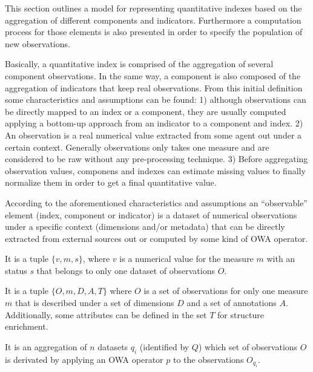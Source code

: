 This section outlines a model for representing quantitative indexes based on the aggregation 
of different components and indicators. Furthermore a computation process for those elements is 
also presented in order to specify the population of new observations.

Basically, a quantitative index is comprised of the aggregation of several component observations. In the same way, 
a component is also composed of the aggregation of indicators that keep real observations. From this initial definition 
some characteristics and assumptions can be found: 1) although observations can be directly mapped to an index or a component, they 
are usually computed applying a bottom-up approach from an indicator to a component and index. 2) An observation is 
a real numerical value extracted from some agent out under a certain context. Generally observations only takes one measure and are considered 
to be raw without any pre-processing technique. 3) Before aggregating observation values, componens and indexes can 
estimate missing values to finally normalize them in order to get a final quantitative value.

According to the aforementioned characteristics and assumptions an ``observable'' element (index, component or indicator) is a 
dataset of numerical observations under a specific context (dimensions and/or metadata) that can be directly extracted from external 
sources out or computed by some kind of OWA operator. 

\begin{definition}[Observation-$o$]\upshape
It is a tuple $\{v,m,s\}$, where $v$ is a numerical value for the measure $m$ with an status $s$ that belongs to 
only one dataset of observations $O$. 
\end{definition}


\begin{definition}[Dataset-$q$]\upshape
It is a tuple $\{O,m,D,A,T\}$ where $O$ is a set of observations for only one measure $m$ that is described under 
a set of dimensions $D$ and a set of annotations $A$. Additionally, some attributes can be defined in the set $T$ for structure enrichment. 
\end{definition}


\begin{definition}\upshape
It is an aggregation of $n$ datasets $q_i$ (identified by $Q$) which set of observations $O$ is derivated by applying 
an OWA operator $p$ to the observations $O_{q_i}$. 
\end{definition}

